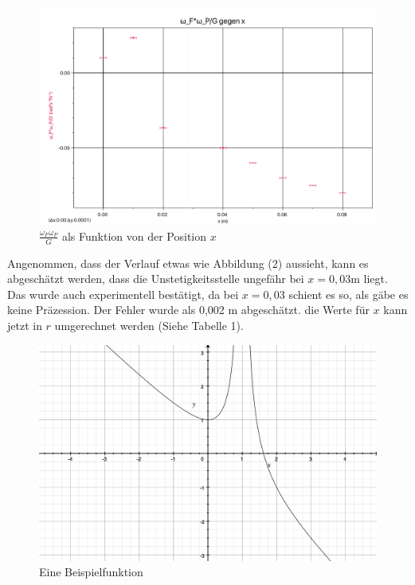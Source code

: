 \documentclass[11pt,a4paper]{article} %
\begin{document}
\begin{figure}
	\centering
	\includegraphics[width=\linewidth]{Abb1}
	\caption{$\frac{\omega_F\omega_P}{G}$ als Funktion von der Position $x$}
\end{figure}

Angenommen, dass der Verlauf etwas wie Abbildung (2) aussieht, kann es abgeschätzt werden, dass die Unstetigkeitsstelle ungefähr bei $x=0,03$m liegt. Das wurde auch experimentell bestätigt, da bei $x=0,03$ schient es so, als gäbe es keine Präzession. Der Fehler wurde als 0,002 m abgeschätzt. die Werte für $x$ kann jetzt in $r$ umgerechnet werden (Siehe Tabelle 1). 

\begin{figure}
	\centering
	\includegraphics[width=\linewidth]{Abb2}
	\caption{Eine Beispielfunktion}
\end{figure}
\end{document}
